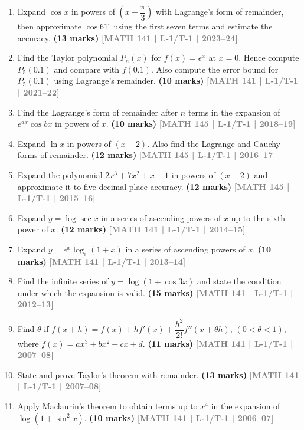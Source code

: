 \documentclass[12pt,a4paper]{article}
\newcommand{\yr}[1]{\hfill\textcolor{gray}{\small\textbf{[#1]}}}
\newcommand{\mk}[1]{\textcolor{orange!70!black}{\small\textbf{(#1 marks)}}}
\begin{document}
\begin{enumerate}\item Expand $\cos x$ in powers of $\left(x-\dfrac{\pi}{3}\right)$ with Lagrange's form of remainder, then approximate $\cos 61^{\circ}$ using the first seven terms and estimate the accuracy.
\mk{13} \yr{MATH 141 | L-1/T-1 | 2023--24}

\item Find the Taylor polynomial $P_{n}(x)$ for $f(x)=e^{x}$ at $x=0$. Hence compute $P_{5}(0.1)$ and compare with $f(0.1)$. Also compute the error bound for $P_{5}(0.1)$ using Lagrange's remainder.
\mk{10} \yr{MATH 141 | L-1/T-1 | 2021--22}

\item Find the Lagrange's form of remainder after $n$ terms in the expansion of $e^{ax}\cos bx$ in powers of $x$.
\mk{10} \yr{MATH 145 | L-1/T-1 | 2018--19}

\item Expand $\ln x$ in powers of $(x-2)$. Also find the Lagrange and Cauchy forms of remainder.
\mk{12} \yr{MATH 145 | L-1/T-1 | 2016--17}

\item Expand the polynomial $2x^{3}+7x^{2}+x-1$ in powers of $(x-2)$ and approximate it to five decimal-place accuracy.
\mk{12} \yr{MATH 145 | L-1/T-1 | 2015--16}

\item Expand $y=\log\sec x$ in a series of ascending powers of $x$ up to the sixth power of $x$.
\mk{12} \yr{MATH 141 | L-1/T-1 | 2014--15}

\item Expand $y=e^{x}\log_{e}(1+x)$ in a series of ascending powers of $x$.
\mk{10} \yr{MATH 141 | L-1/T-1 | 2013--14}

\item Find the infinite series of $y=\log(1+\cos 3x)$ and state the condition under which the expansion is valid.
\mk{15} \yr{MATH 141 | L-1/T-1 | 2012--13}

\item Find $\theta$ if $f(x+h)=f(x)+hf'(x)+\dfrac{h^{2}}{2!}f''(x+\theta h)$, $(0<\theta<1)$, where $f(x)=ax^{3}+bx^{2}+cx+d$.
\mk{11} \yr{MATH 141 | L-1/T-1 | 2007--08}

\item State and prove Taylor's theorem with remainder.
\mk{13} \yr{MATH 141 | L-1/T-1 | 2007--08}

\item Apply Maclaurin's theorem to obtain terms up to $x^{4}$ in the expansion of $\log(1+\sin^{2}x)$.
\mk{10} \yr{MATH 141 | L-1/T-1 | 2006--07}

\end{enumerate}
\end{document}
